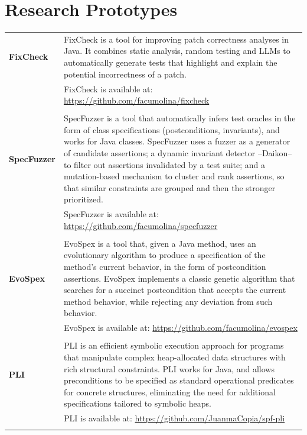 \documentclass[a4paper,10pt]{article} %
\begin{document}
\section{Research Prototypes}
\begin{longtable}{>{\raggedleft\arraybackslash}p{} p{}}

\textbf{FixCheck} & FixCheck is a tool for improving patch correctness analyses in Java. It combines static analysis, random testing and LLMs to automatically generate tests that highlight and explain the potential incorrectness of a patch. \\ 
& FixCheck is available at: \href{https://github.com/facumolina/fixcheck}{https://github.com/facumolina/fixcheck} \\ & \\

\textbf{SpecFuzzer} & SpecFuzzer is a tool that automatically infers test oracles in the form of class specifications (postconditions, invariants), and works for Java classes. SpecFuzzer uses a fuzzer as a generator of candidate assertions; a dynamic invariant detector –Daikon– to filter out assertions invalidated by a test suite; and a mutation-based mechanism to cluster and rank assertions, so that similar constraints are grouped and then the stronger prioritized. \\ 
& SpecFuzzer is available at: \href{https://github.com/facumolina/specfuzzer}{https://github.com/facumolina/specfuzzer} \\ & \\


\textbf{EvoSpex} & EvoSpex is a tool that, given a Java method, uses an evolutionary algorithm to produce a specification of the method's current behavior, in the form of postcondition assertions. EvoSpex implements a classic genetic algorithm that searches for a succinct postcondition that accepts the current method behavior, while rejecting any deviation from such behavior. \\ 
& EvoSpex is available at: \href{https://github.com/facumolina/evospex}{https://github.com/facumolina/evospex} \\ & \\

\textbf{PLI} & PLI is an efficient symbolic execution approach for programs that manipulate complex heap-allocated data structures with rich structural constraints. PLI works for Java, and allows preconditions to be specified as standard operational predicates for concrete structures, eliminating the need for additional specifications tailored to symbolic heaps. \\
& PLI is available at: \href{https://github.com/JuanmaCopia/spf-pli}{https://github.com/JuanmaCopia/spf-pli} \\ & \\

\end{longtable}
\end{document}
